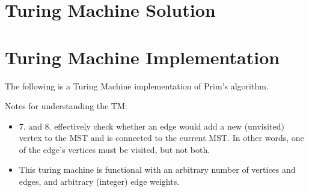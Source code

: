 \documentclass{article}
\begin{document}
\section{Turing Machine Solution}
\section{Turing Machine Implementation}

The following is a Turing Machine implementation of Prim's algorithm.

Notes for understanding the TM:
\begin{itemize}
	\item 7. and 8. effectively check whether an edge would add a new (unvisited) vertex to the MST and is connected to the current MST. In other words, one of the edge's vertices must be visited, but not both.
	\item This turing machine is functional with an arbitrary number of vertices and edges, and arbitrary (integer) edge weights.
\end{itemize}
\end{document}
